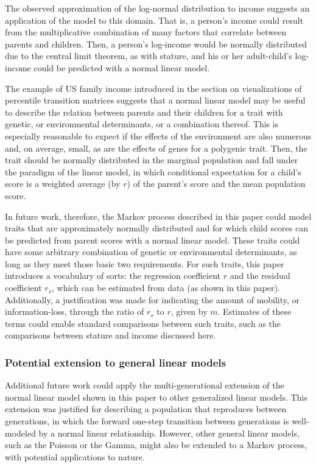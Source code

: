 \documentclass[a4paper,11pt]{article} %
\begin{document}
The observed approximation of the log-normal distribution to income suggests an application of the model to this domain. That is, a person's income could result from the multiplicative combination of many factors that correlate between parents and children. Then, a person's log-income would be normally distributed due to the central limit theorem, as with stature, and his or her adult-child's log-income could be predicted with a normal linear model.

The example of US family income introduced in the section on visualizations of percentile transition matrices suggests that a normal linear model may be useful to describe the relation between parents and their children for a trait with genetic, or environmental determinants, or a combination thereof. This is especially reasonable to expect if the effects of the environment are also numerous and, on average, small, as are the effects of genes for a polygenic trait. Then, the trait should be normally distributed in the marginal population and fall under the paradigm of the linear model, in which conditional expectation for a child's score is a weighted average (by $r$) of the parent's score and the mean population score. 

In future work, therefore, the Markov process described in this paper could model traits that are approximately normally distributed and for which child scores can be predicted from parent scores with a normal linear model. These traits could have some arbitrary combination of genetic or environmental determinants, as long as they meet those basic two requirements. For such traits, this paper introduces a vocabulary of sorts: the regression coefficient $r$ and the residual coefficient $r_s$, which can be estimated from data (as shown in this paper). Additionally, a justification was made for indicating the amount of mobility, or information-loss, through the ratio of $r_s$ to $r$, given by $m$. Estimates of these terms could enable standard comparisons between such traits, such as the comparisons between stature and income discussed here. 

\subsubsection*{Potential extension to general linear models}

Additional future work could apply the multi-generational extension of the normal linear model shown in this paper to other generalized linear models. This extension was justified for describing a population that reproduces between generations, in which the forward one-step transition between generations is well-modeled by a normal linear relationship. However, other general linear models, such as the Poisson or the Gamma, might also be extended to a Markov process, with potential applications to nature. 
\end{document}
